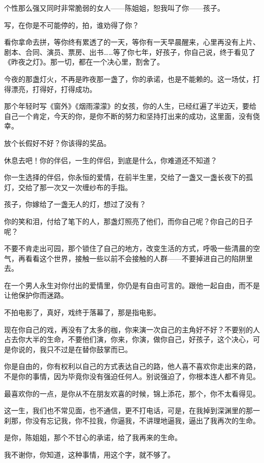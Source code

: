 \par 个性那么强又同时非常脆弱的女人——陈姐姐，恕我叫了你——孩子。
\par 写，在你是不可能停的，拍，谁劝得了你？
\par 看你拿命去拼，等你终有累透了的一天，等你有一天早晨醒来，心里再没有上片、剧本、合同、演员、票房、出书……等了你七年，好孩子，你自己说，终于看见了《昨夜之灯》。那一切，都在一个决心里，割舍了。
\par 今夜的那盏灯火，不再是昨夜那一盏了，你的承诺，也是不能赖的。这一场仗，打得漂亮，打得好，打得成功。
\par 那个年轻时写《窗外》《烟雨濛濛》的女孩，你的人生，已经红遍了半边天，要给自己一个肯定，今天的你，是你不断的努力和坚持打出来的成功，这里面，没有侥幸。
\par 放个长假好不好？你该得的奖品。
\par 休息去吧！你的伴侣，一生的伴侣，到底是什么，你难道还不知道？
\par 你一生选择的伴侣，你永恒的爱情，在前半生里，交给了一盏又一盏长夜下的孤灯，交给了那一次又一次缠纱布的手指。
\par 孩子，你嫁给了一盏无人的灯，想过了没有？
\par 你的笑和泪，付给了笔下的人，那盏灯照亮了他们，而你自己呢？你自己的日子呢？
\par 不要不肯走出可园，那个锁住了自己的地方，改变生活的方式，呼吸一些清晨的空气，再看看这个世界，接触一些以前不会接触的人群——不要掉进自己的陷阱里去。
\par 在一个男人永生对你付出的爱情里，你仍是有自由可言的。跟他一起自由，而不是让他保护你而迷路。
\par 不拍电影了，真好，戏终于落幕了，那是指电影。
\par 现在你自己的戏，再没有了太多的枷，你来演一次自己的主角好不好？不要别的人占去你大半的生命，不要他们演，你来，你演，做你自己，好孩子，这个决心，可是你说的，我只不过是在替你鼓掌而已。
\par 你是自由的，你有权利以自己的方式表达自己的路，他人喜不喜欢你走出来的路，不是你的事情，因为毕竟你没有强迫任何人。别说强迫了，你根本连人都不肯见。
\par 最喜欢你的一点，是你从不在朋友欢喜的时候，锦上添花，那个，你不太看得见。
\par 这一生，我们也不常见面，也不通信，更不打电话，可是，在我掉到深渊里的那一刹那，你没有忘记我，你不拉我，你逼我，不讲理地逼我，逼出了我再次的生命。
\par 是你，陈姐姐，那个不甘心的承诺，给了我再来的生命。
\par 我不谢你，你知道，这种事情，用这个字，就不够了。
